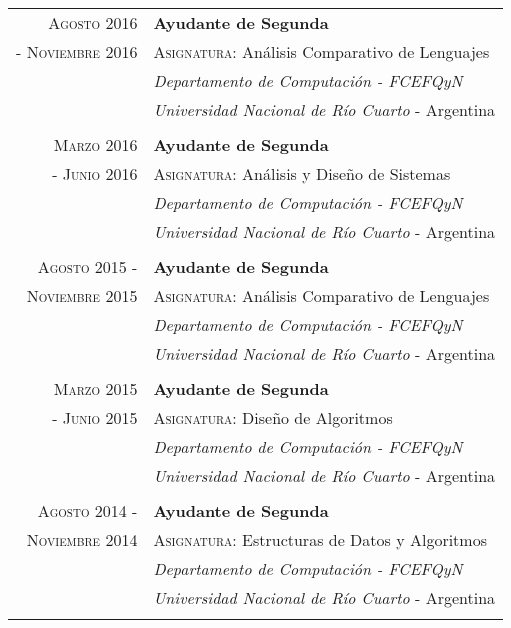 \documentclass[a4paper,10pt]{article} %
\begin{document}
\begin{longtable}{rl}
\textsc{Agosto 2016} & \textbf{Ayudante de Segunda} \\
\textsc{- Noviembre 2016} & \textsc{Asignatura:} Análisis Comparativo de Lenguajes \\ & \textit{Departamento de Computación - FCEFQyN} \\  
& \textit{Universidad Nacional de Río Cuarto} - Argentina \\ & \\

\textsc{Marzo 2016} & \textbf{Ayudante de Segunda} \\
\textsc{- Junio 2016} & \textsc{Asignatura:} Análisis y Diseño de Sistemas \\ & \textit{Departamento de Computación - FCEFQyN} \\  
& \textit{Universidad Nacional de Río Cuarto} - Argentina \\ & \\

\textsc{Agosto 2015 -} & \textbf{Ayudante de Segunda} \\
\textsc{Noviembre 2015} & \textsc{Asignatura:} Análisis Comparativo de Lenguajes \\ & \textit{Departamento de Computación - FCEFQyN} \\  
& \textit{Universidad Nacional de Río Cuarto} - Argentina \\ & \\

\textsc{Marzo 2015} & \textbf{Ayudante de Segunda} \\
\textsc{- Junio 2015} & \textsc{Asignatura:} Diseño de Algoritmos \\ & \textit{Departamento de Computación - FCEFQyN} \\ & \textit{Universidad Nacional de Río Cuarto} - Argentina \\ & \\ 

\textsc{Agosto 2014 -} & \textbf{Ayudante de Segunda} \\
\textsc{Noviembre 2014} & \textsc{Asignatura:} Estructuras de Datos y Algoritmos \\ & \textit{Departamento de Computación - FCEFQyN} \\ & \textit{Universidad Nacional de Río Cuarto} - Argentina \\ & \\ 

\end{longtable}
\end{document}
